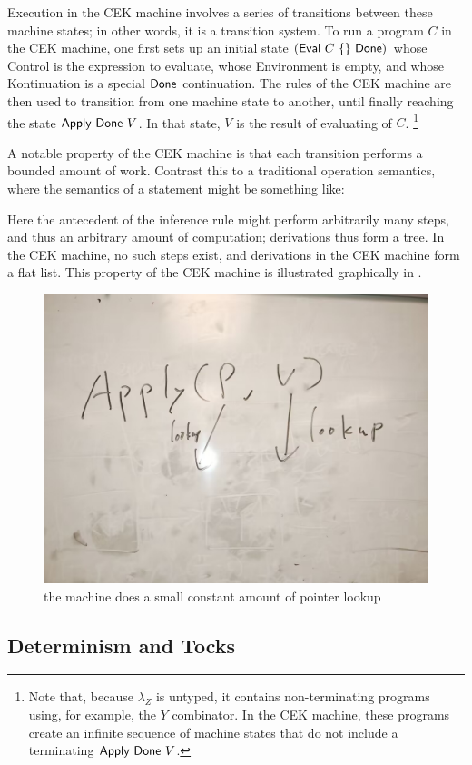 Execution in the CEK machine involves a series of transitions between
these machine states; in other words, it is a transition system. To
run a program $C$ in the CEK machine, one first sets up an initial
state $(\Eval~C~\{\}~\Done)$ whose Control is the expression to
evaluate, whose Environment is empty, and whose Kontinuation is a
special $\Done$ continuation. The rules of the CEK machine are then
used to transition from one machine state to another, until finally
reaching the state $\Apply~\Done~V$. In that state, $V$ is the result
of evaluating of $C$.%
\footnote{Note that, because $\lambda_Z$ is untyped, it contains
non-terminating programs using, for example, the $Y$ combinator. In
the CEK machine, these programs create an infinite sequence of machine
states that do not include a terminating $\Apply~\Done~V$.}

A notable property of the CEK machine is that each transition performs
a bounded amount of work. Contrast this to a traditional operation
semantics, where the semantics of a \sCase statement might be something
like:

\begin{mathpar}
\end{mathpar}

Here the antecedent of the inference rule might perform arbitrarily
many steps, and thus an arbitrary amount of computation; derivations
thus form a tree. In the CEK machine, no such steps exist, and
derivations in the CEK machine form a flat list. This property of the
CEK machine is illustrated graphically in .

\begin{figure}
\includegraphics[width=0.5\columnwidth]{img1}
\caption{the machine does a small constant amount of pointer lookup}
\label{fig:constant}
\end{figure}

\subsection{Determinism and Tocks}

